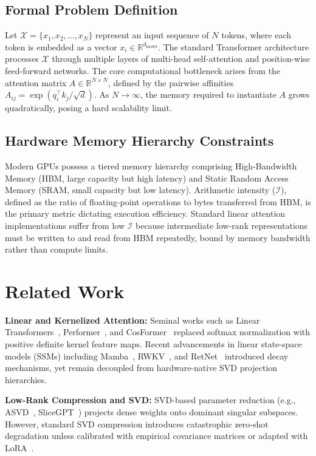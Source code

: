 \documentclass[10pt,twocolumn,letterpaper]{article}
\begin{document}
\subsection{Formal Problem Definition}
Let $\mathcal{X} = \{x_1, x_2, \dots, x_N\}$ represent an input sequence of $N$ tokens, where each token is embedded as a vector $x_i \in \mathbb{R}^{d_{\text{model}}}$. The standard Transformer architecture processes $\mathcal{X}$ through multiple layers of multi-head self-attention and position-wise feed-forward networks. The core computational bottleneck arises from the attention matrix $A \in \mathbb{R}^{N \times N}$, defined by the pairwise affinities $A_{ij} = \exp(q_i^\top k_j / \sqrt{d})$. As $N \to \infty$, the memory required to instantiate $A$ grows quadratically, posing a hard scalability limit.

\subsection{Hardware Memory Hierarchy Constraints}
Modern GPUs possess a tiered memory hierarchy comprising High-Bandwidth Memory (HBM, large capacity but high latency) and Static Random Access Memory (SRAM, small capacity but low latency). Arithmetic intensity ($\mathcal{I}$), defined as the ratio of floating-point operations to bytes transferred from HBM, is the primary metric dictating execution efficiency. Standard linear attention implementations suffer from low $\mathcal{I}$ because intermediate low-rank representations must be written to and read from HBM repeatedly, bound by memory bandwidth rather than compute limits.

\section{Related Work}
\label{sec:related}

\textbf{Linear and Kernelized Attention:} Seminal works such as Linear Transformers~\cite{katharopoulos2020transformers}, Performer~\cite{choromanski2020rethinking}, and CosFormer~\cite{qin2022cosformer} replaced softmax normalization with positive definite kernel feature maps. Recent advancements in linear state-space models (SSMs) including Mamba~\cite{gu2023mamba}, RWKV~\cite{peng2023rwkv}, and RetNet~\cite{sun2023retentive} introduced decay mechanisms, yet remain decoupled from hardware-native SVD projection hierarchies.

\textbf{Low-Rank Compression and SVD:} SVD-based parameter reduction (e.g., ASVD~\cite{yuan2023asvd}, SliceGPT~\cite{ashkboos2024slicegpt}) projects dense weights onto dominant singular subspaces. However, standard SVD compression introduces catastrophic zero-shot degradation unless calibrated with empirical covariance matrices or adapted with LoRA~\cite{hu2021lora}.
\end{document}
